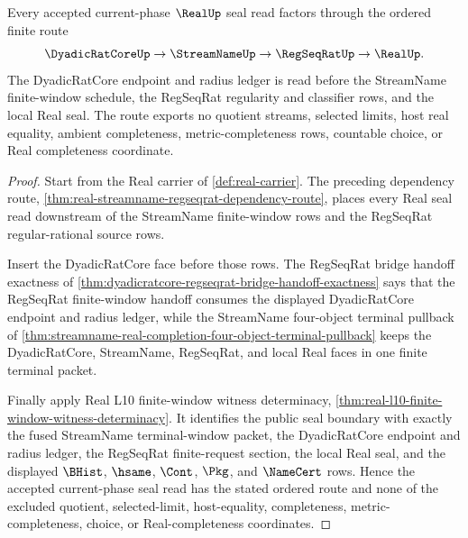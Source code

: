 \begin{theorem}
\label{thm:real-dyadic-streamname-regseqrat-dependency-route}
Every accepted current-phase $\RealUp$ seal read factors through the ordered finite route
$$
\DyadicRatCoreUp \to \StreamNameUp \to \RegSeqRatUp \to \RealUp .
$$
The DyadicRatCore endpoint and radius ledger is read before the StreamName finite-window schedule, the RegSeqRat regularity and classifier rows, and the local Real seal. The route exports no quotient streams, selected limits, host real equality, ambient completeness, metric-completeness rows, countable choice, or Real completeness coordinate.
\end{theorem}
\begin{proof}
Start from the Real carrier of \autoref{def:real-carrier}. The preceding dependency route, \autoref{thm:real-streamname-regseqrat-dependency-route}, places every Real seal read downstream of the StreamName finite-window rows and the RegSeqRat regular-rational source rows.

Insert the DyadicRatCore face before those rows. The RegSeqRat bridge handoff exactness of \autoref{thm:dyadicratcore-regseqrat-bridge-handoff-exactness} says that the RegSeqRat finite-window handoff consumes the displayed DyadicRatCore endpoint and radius ledger, while the StreamName four-object terminal pullback of \autoref{thm:streamname-real-completion-four-object-terminal-pullback} keeps the DyadicRatCore, StreamName, RegSeqRat, and local Real faces in one finite terminal packet.

Finally apply Real L10 finite-window witness determinacy, \autoref{thm:real-l10-finite-window-witness-determinacy}. It identifies the public seal boundary with exactly the fused StreamName terminal-window packet, the DyadicRatCore endpoint and radius ledger, the RegSeqRat finite-request section, the local Real seal, and the displayed $\BHist$, $\hsame$, $\Cont$, $\Pkg$, and $\NameCert$ rows. Hence the accepted current-phase seal read has the stated ordered route and none of the excluded quotient, selected-limit, host-equality, completeness, metric-completeness, choice, or Real-completeness coordinates.
\end{proof}

